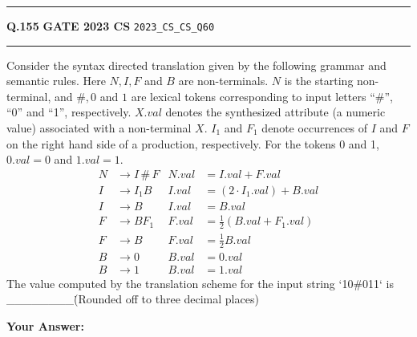 \documentclass[a4paper,10pt]{article}
\begin{document}
\vspace{6pt}\hrule height 0.35pt\vspace{6pt}
\noindent
\begin{tcolorbox}[
    blanker,
    sidebyside,
    sidebyside align=top,
    lefthand width=0.55\textwidth,
    top=4pt, bottom=4pt, left=0pt, right=0pt,
    middle=16pt,
    underlay={
        \draw[dashed, black!80, line width=0.8pt, dash pattern=on 4pt off 3pt]
            ([xshift=0.55\textwidth+8pt]frame.north west) --
            ([xshift=0.55\textwidth+8pt]frame.south west);
    }
]
\textbf{Q.155}  \hfill {\footnotesize\textbf{GATE 2023 CS} \quad \tiny\texttt{2023\_CS\_CS\_Q60}}
\vspace{2pt}\hrule height 0.3pt\vspace{4pt}

Consider the syntax directed translation given by the following grammar and semantic rules. Here $N, I, F$ and $B$ are non-terminals. $N$ is the starting non-terminal, and $\#, 0$ and $1$ are lexical tokens corresponding to input letters ``\#'', ``0'' and ``1'', respectively. $X.val$ denotes the synthesized attribute (a numeric value) associated with a non-terminal $X$. $I_1$ and $F_1$ denote occurrences of $I$ and $F$ on the right hand side of a production, respectively. For the tokens 0 and 1, $0.val = 0$ and $1.val = 1$.
\begin{align*}
N &\to I \,\#\, F & N.val &= I.val + F.val \\
I &\to I_1 B & I.val &= (2 \cdot I_1.val) + B.val \\
I &\to B & I.val &= B.val \\
F &\to B F_1 & F.val &= \frac{1}{2}(B.val + F_1.val) \\
F &\to B & F.val &= \frac{1}{2}B.val \\
B &\to 0 & B.val &= 0.val \\
B &\to 1 & B.val &= 1.val
\end{align*}
The value computed by the translation scheme for the input string `10\#011` is \_\_\_\_\_\_\_\_\. (Rounded off to three decimal places)

\par\vspace{6pt}\noindent\textbf{Your Answer:} \fbox{\rule{0pt}{1.3ex}\hspace{3cm}}

\tcblower


\end{tcolorbox}
\end{document}
